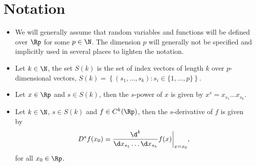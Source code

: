 \section{Notation}

\begin{itemize}
    \item We will generally assume that random variables and functions will be defined over $\Rp$ for some $p \in \N$. The dimension $p$ will generally not be specified and implicitly used in several places to lighten the notation.
    \item Let $k \in \N$, the set $S(k)$ is the set of index vectors of length $k$ over $p$-dimensional vectors, $S(k) = \left\{ (s_1, \ldots, s_k) : s_i \in \{1, \ldots, p\}\right\}$.
    \item Let $x \in \Rp$ and $s \in S(k)$, then the $s$-power of $x$ is given by $x^s = x_{s_1} \ldots x_{s_k}$.
    \item {
        Let $k \in \N$, $s \in S(k)$ and $f \in C^k(\Rp)$, then the $s$-derivative of $f$ is given by
        \begin{equation*}
            D^s f(x_0) = \frac{\d^k}{\d x_{s_1} \ldots \d x_{s_k}} f(x) \bigg|_{x=x_0},
        \end{equation*}
        for all $x_0 \in \Rp$.  
    }
\end{itemize}